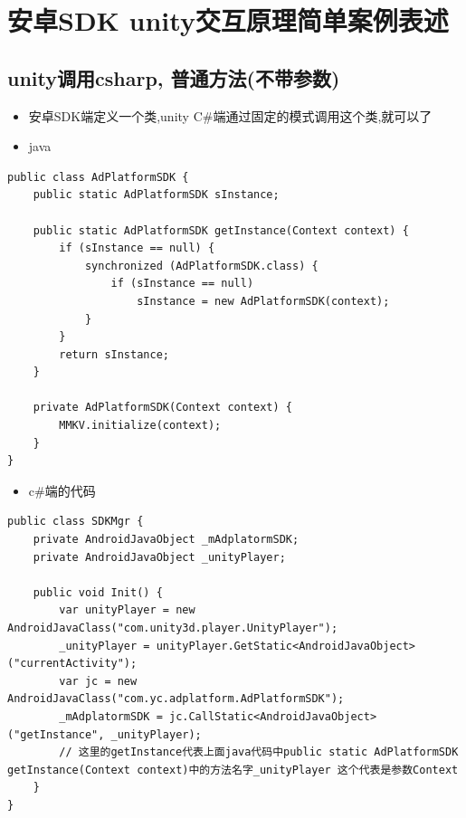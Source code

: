 \documentclass[9pt, b5paper]{article}
\begin{document}
\section{安卓SDK unity交互原理简单案例表述}
\label{sec-5}
\subsection{unity调用csharp, 普通方法(不带参数)}
\label{sec-5-1}
\begin{itemize}
\item 安卓SDK端定义一个类,unity C\#端通过固定的模式调用这个类,就可以了
\item java
\end{itemize}
\begin{verbatim}
public class AdPlatformSDK {
    public static AdPlatformSDK sInstance;

    public static AdPlatformSDK getInstance(Context context) {
        if (sInstance == null) {
            synchronized (AdPlatformSDK.class) {
                if (sInstance == null) 
                    sInstance = new AdPlatformSDK(context);
            }
        }
        return sInstance;
    }

    private AdPlatformSDK(Context context) {
        MMKV.initialize(context); 
    }
}
\end{verbatim}
\begin{itemize}
\item c\#端的代码
\end{itemize}
\begin{verbatim}
public class SDKMgr {
    private AndroidJavaObject _mAdplatormSDK;
    private AndroidJavaObject _unityPlayer;

    public void Init() {
        var unityPlayer = new AndroidJavaClass("com.unity3d.player.UnityPlayer");
        _unityPlayer = unityPlayer.GetStatic<AndroidJavaObject>("currentActivity");
        var jc = new AndroidJavaClass("com.yc.adplatform.AdPlatformSDK");
        _mAdplatormSDK = jc.CallStatic<AndroidJavaObject>("getInstance", _unityPlayer);
        // 这里的getInstance代表上面java代码中public static AdPlatformSDK getInstance(Context context)中的方法名字_unityPlayer 这个代表是参数Context 
    }
}
\end{verbatim}
\end{document}
